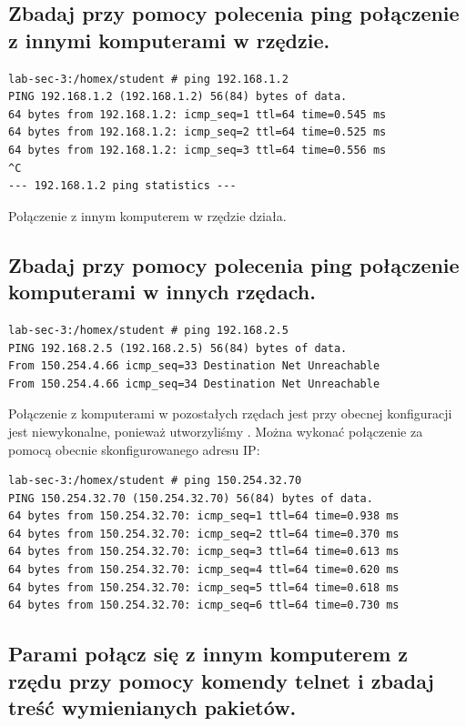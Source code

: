 \documentclass[polish, a4paper]{article}
\begin{document}
\subsection{Zbadaj przy pomocy polecenia ping połączenie z innymi komputerami w rzędzie.}

\begin{verbatim}
lab-sec-3:/homex/student # ping 192.168.1.2
PING 192.168.1.2 (192.168.1.2) 56(84) bytes of data.
64 bytes from 192.168.1.2: icmp_seq=1 ttl=64 time=0.545 ms
64 bytes from 192.168.1.2: icmp_seq=2 ttl=64 time=0.525 ms
64 bytes from 192.168.1.2: icmp_seq=3 ttl=64 time=0.556 ms
^C
--- 192.168.1.2 ping statistics ---
\end{verbatim}

Połączenie z innym komputerem w rzędzie działa.

\subsection{Zbadaj przy pomocy polecenia ping połączenie komputerami w innych rzędach.}

\begin{verbatim}
lab-sec-3:/homex/student # ping 192.168.2.5
PING 192.168.2.5 (192.168.2.5) 56(84) bytes of data.
From 150.254.4.66 icmp_seq=33 Destination Net Unreachable
From 150.254.4.66 icmp_seq=34 Destination Net Unreachable
\end{verbatim}

Połączenie z komputerami w pozostałych rzędach jest przy obecnej konfiguracji jest niewykonalne, ponieważ utworzyliśmy . Można wykonać połączenie za pomocą obecnie skonfigurowanego adresu IP:

\begin{verbatim}
lab-sec-3:/homex/student # ping 150.254.32.70
PING 150.254.32.70 (150.254.32.70) 56(84) bytes of data.
64 bytes from 150.254.32.70: icmp_seq=1 ttl=64 time=0.938 ms
64 bytes from 150.254.32.70: icmp_seq=2 ttl=64 time=0.370 ms
64 bytes from 150.254.32.70: icmp_seq=3 ttl=64 time=0.613 ms
64 bytes from 150.254.32.70: icmp_seq=4 ttl=64 time=0.620 ms
64 bytes from 150.254.32.70: icmp_seq=5 ttl=64 time=0.618 ms
64 bytes from 150.254.32.70: icmp_seq=6 ttl=64 time=0.730 ms
\end{verbatim}


\subsection{Parami połącz się z innym komputerem z rzędu przy pomocy komendy telnet i zbadaj treść wymienianych pakietów.}
\end{document}
